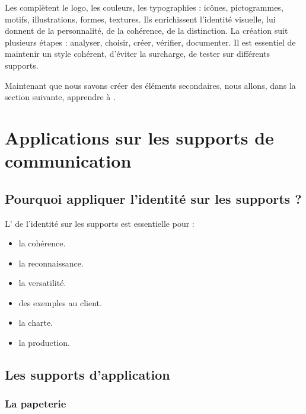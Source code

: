 Les  complètent le logo, les couleurs, les typographies : icônes, pictogrammes, motifs, illustrations, formes, textures. Ils enrichissent l'identité visuelle, lui donnent de la personnalité, de la cohérence, de la distinction. La création suit plusieurs étapes : analyser, choisir, créer, vérifier, documenter. Il est essentiel de maintenir un style cohérent, d'éviter la surcharge, de tester sur différents supports.

Maintenant que nous savons créer des éléments secondaires, nous allons, dans la section suivante, apprendre à .

\section{Applications sur les supports de communication}

\subsection{Pourquoi appliquer l'identité sur les supports ?}

L' de l'identité sur les supports est essentielle pour :

\begin{itemize}
    \item {} la cohérence.
    \item {} la reconnaissance.
    \item {} la versatilité.
    \item {} des exemples au client.
    \item {} la charte.
    \item {} la production.
\end{itemize}

\subsection{Les supports d'application}

\subsubsection{La papeterie}

